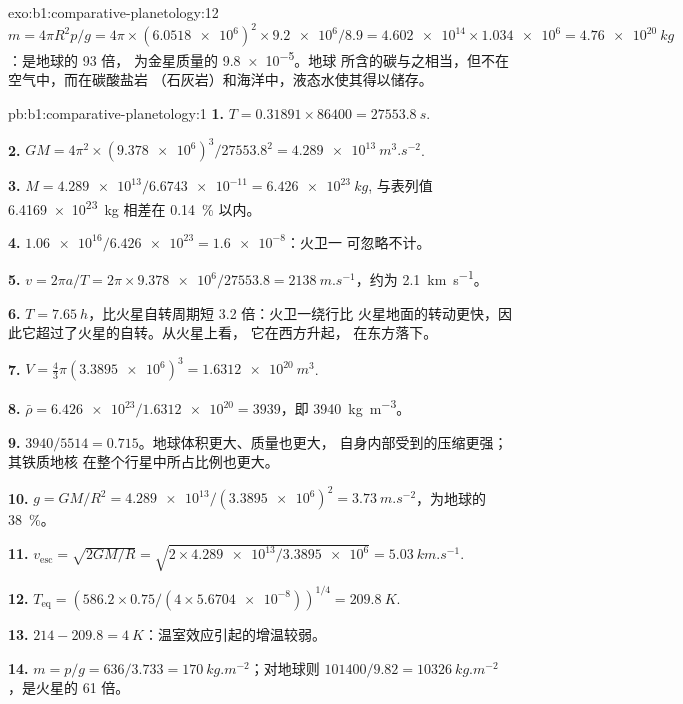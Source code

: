 \begin{solution}{exo:b1:comparative-planetology:12}
$m = 4\pi R^2p/g = 4\pi\times(\num{6.0518e6})^2\times\num{9.2e6}/8.9 =
\num{4.602e14}\times\num{1.034e6} = \qty{4.76e20}{kg}$：是地球的 93 倍，
为金星质量的 \num{9.8e-5}。地球
所含的碳与之相当，但不在空气中，而在碳酸盐岩
（石灰岩）和海洋中，液态水使其得以储存。
\end{solution}

\begin{solution}{pb:b1:comparative-planetology:1}
\textbf{1.} $T = 0.31891\times86400 = \qty{27553.8}{s}$.

\textbf{2.} $GM = 4\pi^2\times(\num{9.378e6})^3/\num{27553.8}^2 =
\qty{4.289e13}{m^3.s^{-2}}$.

\textbf{3.} $M = \num{4.289e13}/\num{6.6743e-11} = \qty{6.426e23}{kg}$,
与表列值 \qty{6.4169e23}{kg} 相差在 \qty{0.14}{\percent} 以内。

\textbf{4.} $\num{1.06e16}/\num{6.426e23} = \num{1.6e-8}$：火卫一
可忽略不计。

\textbf{5.} $v = 2\pi a/T = 2\pi\times\num{9.378e6}/27553.8 =
\qty{2138}{m.s^{-1}}$，约为 \qty{2.1}{km.s^{-1}}。

\textbf{6.} $T = \qty{7.65}{h}$，比火星自转周期短 3.2 倍：火卫一绕行比
火星地面的转动更快，因此它超过了火星的自转。从火星上看，
它在西方升起，
在东方落下。

\textbf{7.} $V = \tfrac43\pi(\num{3.3895e6})^3 = \qty{1.6312e20}{m^3}$.

\textbf{8.} $\bar\rho = \num{6.426e23}/\num{1.6312e20} = 3939$，即
\qty{3940}{kg.m^{-3}}。

\textbf{9.} $3940/5514 = 0.715$。地球体积更大、质量也更大，
自身内部受到的压缩更强；其铁质地核
在整个行星中所占比例也更大。

\textbf{10.} $g = GM/R^2 = \num{4.289e13}/(\num{3.3895e6})^2 =
\qty{3.73}{m.s^{-2}}$，为地球的 \qty{38}{\percent}。

\textbf{11.} $v_\mathrm{esc} = \sqrt{2GM/R} = \sqrt{2\times\num{4.289e13}/
\num{3.3895e6}} = \qty{5.03}{km.s^{-1}}$.

\textbf{12.} $T_\mathrm{eq} = (586.2\times0.75/(4\times\num{5.6704e-8}))^{1/4}
= \qty{209.8}{K}$.

\textbf{13.} $214 - 209.8 = \qty{4}{K}$：温室效应引起的增温较弱。

\textbf{14.} $m = p/g = 636/3.733 = \qty{170}{kg.m^{-2}}$；对地球则
$101400/9.82 = \qty{10326}{kg.m^{-2}}$，是火星的 61 倍。


\end{solution}
